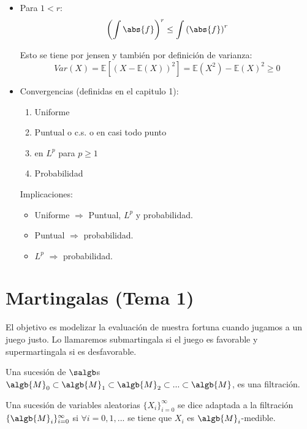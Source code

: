 \documentclass{apuntes}
\begin{document}
\begin{itemize}
\begin{itemize}
\begin{enumerate}
\end{enumerate}


\end{itemize}
\item Para $1<r$:
$$\left(\int \abs{f}\right)^r \leq\int \left( \abs{f} \right)^r$$

Esto se tiene por jensen y también por definición de varianza:
\[
Var(X)=\mathbb{E}[(X-\mathbb{E}(X))^2] = \mathbb{E}(X^2) - \mathbb{E}(X)^2 \geq 0
\]

\item Convergencias (definidas en el capitulo 1):
\begin{enumerate}
\item Uniforme
\item Puntual o c.s. o en casi todo punto
\item en $L^p$ para $p\geq 1$
\item Probabilidad
\end{enumerate}
Implicaciones:
\begin{itemize}
\item Uniforme $\Rightarrow$ Puntual, $L^p$ y probabilidad.
\item Puntual $\Rightarrow$ probabilidad.
\item $L^p$ $\Rightarrow$ probabilidad.
\end{itemize}
\end{itemize}






\chapter{Martingalas (Tema 1)}
El objetivo es modelizar la evaluación de nuestra fortuna cuando jugamos a un juego justo. Lo llamaremos submartingala si el juego es favorable y supermartingala si es desfavorable.

\begin{defn}[Filtración]
Una sucesión de $\salgb$s $\algb{M}_0 \subset \algb{M}_1 \subset \algb{M}_2 \subset ... \subset \algb{M}$, es una filtración.
\end{defn}

\begin{defn}
Una sucesión de variables aleatorias $\{X_i\}_{i=0}^{\infty}$ se dice adaptada a la filtración $\{\algb{M}_i\}_{i=0}^{\infty}$ si $\forall i = 0,1,...$ se tiene que $X_i$ es $\algb{M}_i$-medible.
\end{defn}
\end{document}
